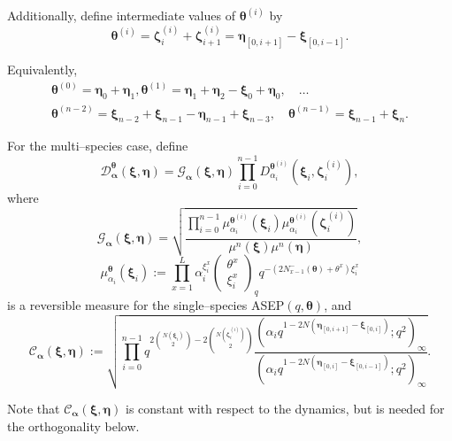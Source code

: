 \documentclass{ximera}
\begin{document}
 Additionally, define intermediate values of $\boldsymbol{\theta}^{(i)}$ by 
$$
\boldsymbol{\theta}^{(i)} = \boldsymbol\zeta^{(i)}_i +  \boldsymbol\zeta^{(i)}_{i+1}=\boldsymbol\eta_{[0,i+1]}-\boldsymbol\xi_{[0,i-1]}. 
$$
 



Equivalently,
\begin{multline*}
 \boldsymbol{\theta}^{(0)} = \boldsymbol\eta_0 + \boldsymbol\eta_1, \boldsymbol{\theta}^{(1)} = \boldsymbol\eta_1 + \boldsymbol\eta_2  - \boldsymbol\xi_0 +  \boldsymbol\eta_0 , \quad \ldots\\ \boldsymbol{\theta}^{(n-2)} =\boldsymbol\xi_{n-2}+\boldsymbol\xi_{n-1}-\boldsymbol\eta_{n-1} + \boldsymbol\xi_{n-3}  ,  \quad \boldsymbol{\theta}^{(n-1)} = \boldsymbol\xi_{n-1} + \boldsymbol\xi_{n}.   
\end{multline*}



 For the multi--species case, define
$$
\mathcal{D}^{\boldsymbol\theta}_{\boldsymbol{\alpha}}(\boldsymbol\xi, \boldsymbol\eta) =\mathcal{G}_{\boldsymbol{\alpha}}(\boldsymbol\xi,\boldsymbol\eta)\prod_{i=0}^{n-1}D^{  \boldsymbol{\theta}^{(i)} }_{\alpha_i}(\boldsymbol\xi_i, \boldsymbol\zeta^{(i)}_i)
 ,
$$
where 
\begin{equation} \label{curlyG}
\mathcal{G}_{\boldsymbol{\alpha}}(\boldsymbol\xi,\boldsymbol\eta) = \sqrt{ \frac{ \prod_{i=0}^{n-1}\mu_{\alpha_i}^{\boldsymbol{\theta}^{(i)}}(\boldsymbol\xi_i)\mu_{\alpha_i}^{\boldsymbol{\theta}^{(i)}}(\boldsymbol\zeta^{(i)}_i)  }{\mu^{n}(\boldsymbol\xi) \mu^{n}(\boldsymbol\eta) }},
\end{equation}
$$
\mu_{\alpha_i}^{\boldsymbol{\theta}}(\boldsymbol\xi_i):=\prod_{x=1}^{L} \alpha_i^{\xi^{x}_i}\left(\begin{array}{l}\theta^{x} \\ \xi^{x}_i\end{array}\right)_{q} q^{-\left(2 N_{x-1}^{-}(\boldsymbol{\theta})+\theta^{x}\right) \xi_i^{x}}
$$
is a reversible measure for the single--species ASEP$(q,\boldsymbol\theta)$, and 
$$
\mathcal{C}_{\boldsymbol\alpha}(\boldsymbol\xi,\boldsymbol\eta):=\sqrt{\prod_{i=0}^{n-1}q^{2\binom{N(\boldsymbol\xi_i)}{2}-2\binom{N(\boldsymbol\zeta^{(i)}_i)}{2}}\frac{\left(\alpha_i q^{1-2N(\boldsymbol\eta_{[0,i+1]}-\boldsymbol\xi_{[0,i]})} ; q^2\right)_\infty}{\left(\alpha_iq^{1-2N(\boldsymbol\eta_{[0,i]}-\boldsymbol\xi_{[0,i-1]})} ; q^2\right)_\infty}}.
$$

Note that $\mathcal{C}_{\boldsymbol{\alpha}}(\boldsymbol\xi,\boldsymbol\eta)$ is constant with respect to the dynamics, but is needed for the orthogonality below. 
\end{document}
